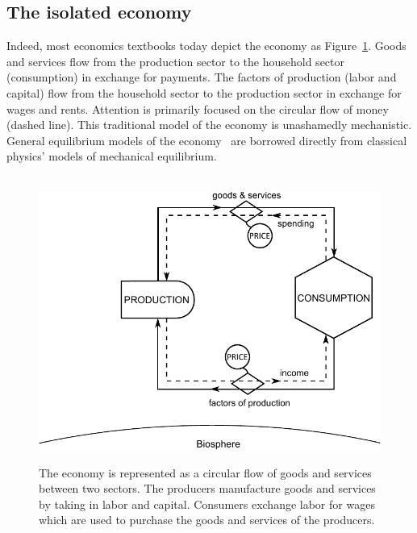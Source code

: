 \subsection{The isolated economy}

Indeed, most economics textbooks today depict the economy 
as Figure~\ref{fig:perp_motion_1}.
Goods and services flow from the production sector
to the household sector (consumption)
in exchange for payments.
The factors of production (labor and capital)
flow from the household sector to the
production sector in exchange for wages and rents.
Attention is primarily focused on the circular flow
of money (dashed line).
This traditional model of the economy is unashamedly mechanistic.
General equilibrium models of the economy~\cite{Walras1892, Walras1993}
are borrowed directly from classical physics' models of 
mechanical equilibrium.\cite{Ingrao1990}

\begin{figure}[!ht]
\centering\
\includegraphics[width=\linewidth]{Part_0/Chapter_Introduction/images/Perpetual_motion_1.pdf}
\caption[The traditional economic model of the economy]{The economy 
is represented as a circular flow of goods and services between two sectors. 
The producers manufacture goods and services 
by taking in labor and capital. 
Consumers exchange labor for wages 
which are used to purchase 
the goods and services of the producers.}
\label{fig:perp_motion_1}
\end{figure}

